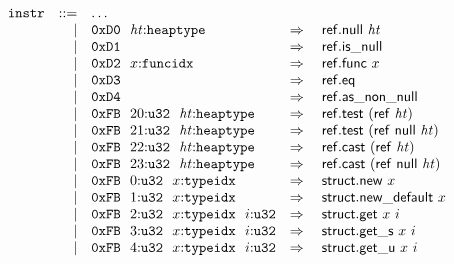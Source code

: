 \vspace{1ex}

$$
\begin{array}[t]{@{}lrrl@{}l@{}l@{}l@{}}
& {\mathtt{instr}} & ::= & \dots \\
& & | & \mathtt{0xD0}~~{\mathit{ht}}{:}{\mathtt{heaptype}} & \quad\Rightarrow\quad{} & \mathsf{ref{.}null}~{\mathit{ht}} \\
& & | & \mathtt{0xD1} & \quad\Rightarrow\quad{} & \mathsf{ref{.}is\_null} \\
& & | & \mathtt{0xD2}~~x{:}{\mathtt{funcidx}} & \quad\Rightarrow\quad{} & \mathsf{ref{.}func}~x \\
& & | & \mathtt{0xD3} & \quad\Rightarrow\quad{} & \mathsf{ref{.}eq} \\
& & | & \mathtt{0xD4} & \quad\Rightarrow\quad{} & \mathsf{ref{.}as\_non\_null} \\
& & | & \mathtt{0xFB}~~20{:}{\mathtt{u32}}~~{\mathit{ht}}{:}{\mathtt{heaptype}} & \quad\Rightarrow\quad{} & \mathsf{ref{.}test}~(\mathsf{ref}~{\mathit{ht}}) \\
& & | & \mathtt{0xFB}~~21{:}{\mathtt{u32}}~~{\mathit{ht}}{:}{\mathtt{heaptype}} & \quad\Rightarrow\quad{} & \mathsf{ref{.}test}~(\mathsf{ref}~\mathsf{null}~{\mathit{ht}}) \\
& & | & \mathtt{0xFB}~~22{:}{\mathtt{u32}}~~{\mathit{ht}}{:}{\mathtt{heaptype}} & \quad\Rightarrow\quad{} & \mathsf{ref{.}cast}~(\mathsf{ref}~{\mathit{ht}}) \\
& & | & \mathtt{0xFB}~~23{:}{\mathtt{u32}}~~{\mathit{ht}}{:}{\mathtt{heaptype}} & \quad\Rightarrow\quad{} & \mathsf{ref{.}cast}~(\mathsf{ref}~\mathsf{null}~{\mathit{ht}}) \\
& & | & \mathtt{0xFB}~~0{:}{\mathtt{u32}}~~x{:}{\mathtt{typeidx}} & \quad\Rightarrow\quad{} & \mathsf{struct{.}new}~x \\
& & | & \mathtt{0xFB}~~1{:}{\mathtt{u32}}~~x{:}{\mathtt{typeidx}} & \quad\Rightarrow\quad{} & \mathsf{struct{.}new\_default}~x \\
& & | & \mathtt{0xFB}~~2{:}{\mathtt{u32}}~~x{:}{\mathtt{typeidx}}~~i{:}{\mathtt{u32}} & \quad\Rightarrow\quad{} & \mathsf{struct{.}get}~x~i \\
& & | & \mathtt{0xFB}~~3{:}{\mathtt{u32}}~~x{:}{\mathtt{typeidx}}~~i{:}{\mathtt{u32}} & \quad\Rightarrow\quad{} & {\mathsf{struct{.}get}}{\mathsf{\_}}{\mathsf{s}}~x~i \\
& & | & \mathtt{0xFB}~~4{:}{\mathtt{u32}}~~x{:}{\mathtt{typeidx}}~~i{:}{\mathtt{u32}} & \quad\Rightarrow\quad{} & {\mathsf{struct{.}get}}{\mathsf{\_}}{\mathsf{u}}~x~i \\

\end{array}$$
